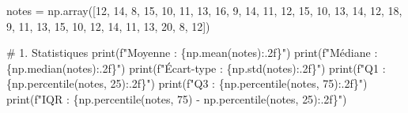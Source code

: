 \documentclass[
  french,
  11pt,
  a4paper,
]{scrbook}
\newenvironment{Shaded}{}{}
\newcommand{\BuiltInTok}[1]{\textcolor[rgb]{0.84,0.23,0.29}{#1}}
\newcommand{\CommentTok}[1]{\textcolor[rgb]{0.42,0.45,0.49}{#1}}
\newcommand{\DecValTok}[1]{\textcolor[rgb]{0.00,0.36,0.77}{#1}}
\newcommand{\NormalTok}[1]{\textcolor[rgb]{0.14,0.16,0.18}{#1}}
\newcommand{\OperatorTok}[1]{\textcolor[rgb]{0.14,0.16,0.18}{#1}}
\newcommand{\SpecialCharTok}[1]{\textcolor[rgb]{0.00,0.36,0.77}{#1}}
\newcommand{\SpecialStringTok}[1]{\textcolor[rgb]{0.01,0.18,0.38}{#1}}
\begin{document}
\begin{tcolorbox}[enhanced jigsaw, arc=.35mm, bottomrule=.15mm, bottomtitle=1mm, breakable, colback=white, colbacktitle=quarto-callout-tip-color!10!white, colframe=quarto-callout-tip-color-frame, coltitle=black, left=2mm, leftrule=.75mm, opacityback=0, opacitybacktitle=0.6, rightrule=.15mm, title=\textcolor{quarto-callout-tip-color}{\faLightbulb}\hspace{0.5em}{✅ Voir la correction}, titlerule=0mm, toprule=.15mm, toptitle=1mm]

\begin{Shaded}
\begin{Highlighting}[]
\NormalTok{notes }\OperatorTok{=}\NormalTok{ np.array([}\DecValTok{12}\NormalTok{, }\DecValTok{14}\NormalTok{, }\DecValTok{8}\NormalTok{, }\DecValTok{15}\NormalTok{, }\DecValTok{10}\NormalTok{, }\DecValTok{11}\NormalTok{, }\DecValTok{13}\NormalTok{, }\DecValTok{16}\NormalTok{, }\DecValTok{9}\NormalTok{, }\DecValTok{14}\NormalTok{, }
                  \DecValTok{11}\NormalTok{, }\DecValTok{12}\NormalTok{, }\DecValTok{15}\NormalTok{, }\DecValTok{10}\NormalTok{, }\DecValTok{13}\NormalTok{, }\DecValTok{14}\NormalTok{, }\DecValTok{12}\NormalTok{, }\DecValTok{18}\NormalTok{, }\DecValTok{9}\NormalTok{, }\DecValTok{11}\NormalTok{, }
                  \DecValTok{13}\NormalTok{, }\DecValTok{15}\NormalTok{, }\DecValTok{10}\NormalTok{, }\DecValTok{12}\NormalTok{, }\DecValTok{14}\NormalTok{, }\DecValTok{11}\NormalTok{, }\DecValTok{13}\NormalTok{, }\DecValTok{20}\NormalTok{, }\DecValTok{8}\NormalTok{, }\DecValTok{12}\NormalTok{])}

\CommentTok{\# 1. Statistiques}
\BuiltInTok{print}\NormalTok{(}\SpecialStringTok{f"Moyenne     : }\SpecialCharTok{\{}\NormalTok{np}\SpecialCharTok{.}\NormalTok{mean(notes)}\SpecialCharTok{:.2f\}}\SpecialStringTok{"}\NormalTok{)}
\BuiltInTok{print}\NormalTok{(}\SpecialStringTok{f"Médiane     : }\SpecialCharTok{\{}\NormalTok{np}\SpecialCharTok{.}\NormalTok{median(notes)}\SpecialCharTok{:.2f\}}\SpecialStringTok{"}\NormalTok{)}
\BuiltInTok{print}\NormalTok{(}\SpecialStringTok{f"Écart{-}type  : }\SpecialCharTok{\{}\NormalTok{np}\SpecialCharTok{.}\NormalTok{std(notes)}\SpecialCharTok{:.2f\}}\SpecialStringTok{"}\NormalTok{)}
\BuiltInTok{print}\NormalTok{(}\SpecialStringTok{f"Q1          : }\SpecialCharTok{\{}\NormalTok{np}\SpecialCharTok{.}\NormalTok{percentile(notes, }\DecValTok{25}\NormalTok{)}\SpecialCharTok{:.2f\}}\SpecialStringTok{"}\NormalTok{)}
\BuiltInTok{print}\NormalTok{(}\SpecialStringTok{f"Q3          : }\SpecialCharTok{\{}\NormalTok{np}\SpecialCharTok{.}\NormalTok{percentile(notes, }\DecValTok{75}\NormalTok{)}\SpecialCharTok{:.2f\}}\SpecialStringTok{"}\NormalTok{)}
\BuiltInTok{print}\NormalTok{(}\SpecialStringTok{f"IQR         : }\SpecialCharTok{\{}\NormalTok{np}\SpecialCharTok{.}\NormalTok{percentile(notes, }\DecValTok{75}\NormalTok{) }\OperatorTok{{-}}\NormalTok{ np}\SpecialCharTok{.}\NormalTok{percentile(notes, }\DecValTok{25}\NormalTok{)}\SpecialCharTok{:.2f\}}\SpecialStringTok{"}\NormalTok{)}


\end{Highlighting}
\end{Shaded}
\end{tcolorbox}
\end{document}
